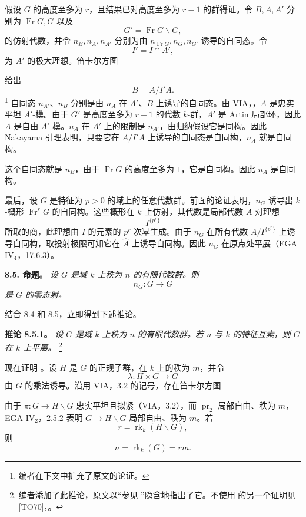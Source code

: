 假设 \(G\) 的高度至多为 \(r\)，且结果已对高度至多为 \(r-1\) 的群得证。令 \(B,A,A'\) 分别为 \(\operatorname{Fr}G,G\) 以及
\[
  G'=\operatorname{Fr}G\backslash G,
\]
的仿射代数，并令 \(n_B,n_A,n_{A'}\) 分别为由 \(n_{\operatorname{Fr}G},n_G,n_{G'}\) 诱导的自同态。令
\[
  I'=I\cap A',
\]
为 \(A'\) 的极大理想。笛卡尔方图
\begin{center}
  \label{sga3:VIIA:8.4-height-induction-cartesian-square}
  
\end{center}
给出
\[
  B=A/I'A.
\]
\footnote{编者在下文中扩充了原文的论证。}
自同态 \(n_{A'}\)、\(n_B\) 分别是由 \(n_A\) 在 \(A'\)、\(B\) 上诱导的自同态。由 VIA，，\(A\) 是忠实平坦 \(A'\)-模。由于 \(G'\) 是高度至多为 \(r-1\) 的代数 \(k\)-群，\(A'\) 是 Artin 局部环，因此 \(A\) 是自由 \(A'\)-模。\(n_A\) 在 \(A'\) 上的限制是 \(n_{A'}\)，由归纳假设它是同构。因此 Nakayama 引理表明，只要它在 \(A/I'A\) 上诱导的自同态是自同构，\(n_A\) 就是自同构。

这个自同态就是 \(n_B\)，由于 \(\operatorname{Fr}G\) 的高度至多为 \(1\)，它是自同构。因此 \(n_A\) 是自同构。

最后，设 \(G\) 是特征为 \(p>0\) 的域上的任意代数群。前面的论证表明，\(n_G\) 诱导出 \(k\)-概形 \(\operatorname{Fr}^rG\) 的自同构。这些概形在 \(k\) 上仿射，其代数是局部代数 \(A\) 对理想
\[
  I^{\{p^r\}}
\]
所取的商，此理想由 \(I\) 的元素的 \(p^r\) 次幂生成。由于 \(n_G\) 在所有代数 \(A/I^{\{p^r\}}\) 上诱导自同构，取投射极限可知它在 \(\widehat A\) 上诱导自同构。因此 \(n_G\) 在原点处平展（EGA IV\(_4\)，17.6.3）。

\medskip
\noindent\textbf{8.5. 命题。}
\label{sga3:VIIA:8.5}
\textit{设 \(G\) 是域 \(k\) 上秩为 \(n\) 的有限代数群。则
\[
  n_G:G\longrightarrow G
\]
是 \(G\) 的零态射。}

结合 8.4 和 8.5，立即得到下述推论。

\medskip
\noindent\textbf{推论 8.5.1。}
\label{sga3:VIIA:8.5.1}
\textit{设 \(G\) 是域 \(k\) 上秩为 \(n\) 的有限代数群。若 \(n\) 与 \(k\) 的特征互素，则 \(G\) 在 \(k\) 上平展。}
\footnote{编者添加了此推论，原文以“参见 ”隐含地指出了它。不使用  的另一个证明见 \textup{[TO70]}，。}

现在证明 。设 \(H\) 是 \(G\) 的正规子群，在 \(k\) 上的秩为 \(m\)，并令
\[
  \lambda:H\times G\longrightarrow G
\]
由 \(G\) 的乘法诱导。沿用 VIA，3.2 的记号，存在笛卡尔方图
\begin{center}
  \label{sga3:VIIA:8.5-normal-subgroup-cartesian-square}
  
\end{center}
由于 \(\pi:G\to H\backslash G\) 忠实平坦且拟紧（VIA，3.2），而 \(\operatorname{pr}_2\) 局部自由、秩为 \(m\)，EGA IV\(_2\)，2.5.2 表明 \(G\to H\backslash G\) 局部自由、秩为 \(m\)。若
\[
  r=\operatorname{rk}_k(H\backslash G),
\]
则
\[
  n=\operatorname{rk}_k(G)=rm.
\]

